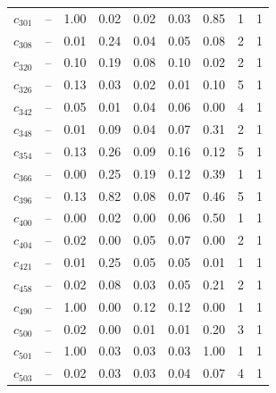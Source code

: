 \begin{tabular}{lcccccccc}
$c_{301}$ & -- & 1.00 & 0.02 & 0.02 & 0.03 & 0.85 & 1 & 1 \\
$c_{308}$ & -- & 0.01 & 0.24 & 0.04 & 0.05 & 0.08 & 2 & 1 \\
$c_{320}$ & -- & 0.10 & 0.19 & 0.08 & 0.10 & 0.02 & 2 & 1 \\
$c_{326}$ & -- & 0.13 & 0.03 & 0.02 & 0.01 & 0.10 & 5 & 1 \\
$c_{342}$ & -- & 0.05 & 0.01 & 0.04 & 0.06 & 0.00 & 4 & 1 \\
$c_{348}$ & -- & 0.01 & 0.09 & 0.04 & 0.07 & 0.31 & 2 & 1 \\
$c_{354}$ & -- & 0.13 & 0.26 & 0.09 & 0.16 & 0.12 & 5 & 1 \\
$c_{366}$ & -- & 0.00 & 0.25 & 0.19 & 0.12 & 0.39 & 1 & 1 \\
$c_{396}$ & -- & 0.13 & 0.82 & 0.08 & 0.07 & 0.46 & 5 & 1 \\
$c_{400}$ & -- & 0.00 & 0.02 & 0.00 & 0.06 & 0.50 & 1 & 1 \\
$c_{404}$ & -- & 0.02 & 0.00 & 0.05 & 0.07 & 0.00 & 2 & 1 \\
$c_{421}$ & -- & 0.01 & 0.25 & 0.05 & 0.05 & 0.01 & 1 & 1 \\
$c_{458}$ & -- & 0.02 & 0.08 & 0.03 & 0.05 & 0.21 & 2 & 1 \\
$c_{490}$ & -- & 1.00 & 0.00 & 0.12 & 0.12 & 0.00 & 1 & 1 \\
$c_{500}$ & -- & 0.02 & 0.00 & 0.01 & 0.01 & 0.20 & 3 & 1 \\
$c_{501}$ & -- & 1.00 & 0.03 & 0.03 & 0.03 & 1.00 & 1 & 1 \\
$c_{503}$ & -- & 0.02 & 0.03 & 0.03 & 0.04 & 0.07 & 4 & 1 \\
\bottomrule
\end{tabular}